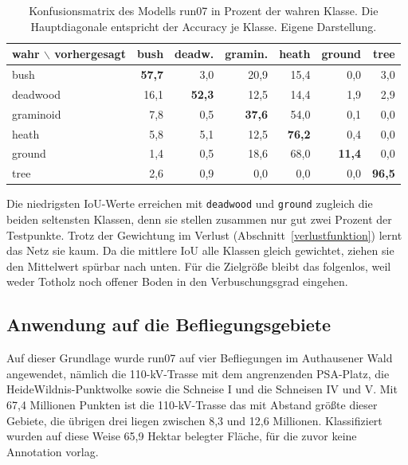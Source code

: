 \begin{table}[H]
    \centering
    \caption[Konfusionsmatrix des Modells run07]{Konfusionsmatrix des Modells
    run07 in Prozent der wahren Klasse. Die Hauptdiagonale entspricht der
    Accuracy je Klasse. Eigene Darstellung.}
    \label{tab:konfusion}
    \begin{tabular}{lrrrrrr}
    \hline
    wahr $\backslash$ vorhergesagt & bush & deadw. & gramin. & heath & ground & tree \\
    \hline
    bush      & \textbf{57,7} & 3,0  & 20,9 & 15,4 & 0,0  & 3,0 \\
    deadwood  & 16,1 & \textbf{52,3} & 12,5 & 14,4 & 1,9  & 2,9 \\
    graminoid & 7,8  & 0,5  & \textbf{37,6} & 54,0 & 0,1  & 0,0 \\
    heath     & 5,8  & 5,1  & 12,5 & \textbf{76,2} & 0,4  & 0,0 \\
    ground    & 1,4  & 0,5  & 18,6 & 68,0 & \textbf{11,4} & 0,0 \\
    tree      & 2,6  & 0,9  & 0,0  & 0,0  & 0,0  & \textbf{96,5} \\
    \hline
    \end{tabular}
\end{table}

Die niedrigsten IoU-Werte erreichen mit \texttt{deadwood} und \texttt{ground}  zugleich die beiden seltensten Klassen, denn sie stellen zusammen nur gut zwei Prozent der Testpunkte. Trotz der Gewichtung im Verlust (Abschnitt~\ref{verlustfunktion}) lernt das Netz sie kaum. Da die mittlere IoU alle Klassen gleich gewichtet, ziehen sie den Mittelwert spürbar nach unten. Für die Zielgröße
bleibt das folgenlos, weil weder Totholz noch offener Boden in den Verbuschungsgrad eingehen.

\subsection{Anwendung auf die Befliegungsgebiete}\label{ergebnis_inferenz}

Auf dieser Grundlage wurde run07 auf vier Befliegungen im Authausener Wald
angewendet, nämlich die 110-kV-Trasse mit dem angrenzenden PSA-Platz, die
HeideWildnis-Punktwolke sowie die Schneise I und die Schneisen IV und V. Mit 67,4
Millionen Punkten ist die 110-kV-Trasse das mit Abstand größte dieser Gebiete,
die übrigen drei liegen zwischen 8,3 und 12,6 Millionen. Klassifiziert wurden
auf diese Weise 65,9 Hektar belegter Fläche, für die zuvor keine Annotation
vorlag.

